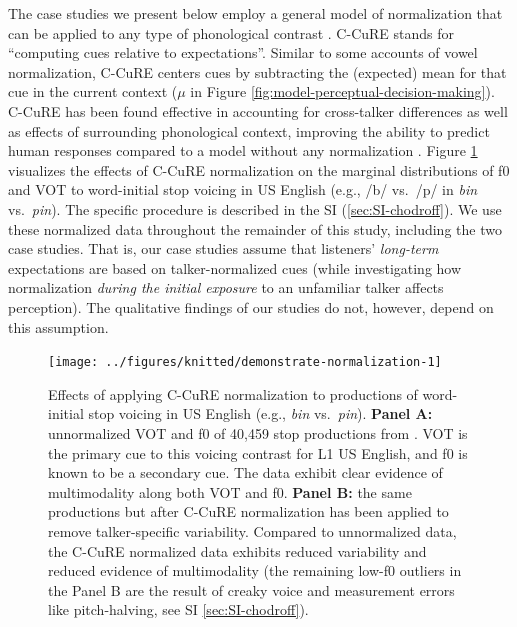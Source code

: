 \documentclass[
  11pt,
  man,floatsintext]{apa6}
\begin{document}
The case studies we present below employ a general model of normalization that can be applied to any type of phonological contrast \autocites[C-CuRE,][]{cole2010,mcmurray-jongman2011}. C-CuRE stands for ``computing cues relative to expectations''. Similar to some accounts of vowel normalization, C-CuRE centers cues by subtracting the (expected) mean for that cue in the current context (\(\mu\) in Figure \ref{fig:model-perceptual-decision-making}). C-CuRE has been found effective in accounting for cross-talker differences as well as effects of surrounding phonological context, improving the ability to predict human responses compared to a model without any normalization \autocites{mcmurray-jongman2011}[see also][]{apfelbaum-mcmurray2015,crinnion2020,kleinschmidt2020,mcmurray-jongman2016,xie2021cognition}. Figure \ref{fig:demonstrate-normalization} visualizes the effects of C-CuRE normalization on the marginal distributions of f0 and VOT to word-initial stop voicing in US English (e.g., /b/ vs.~/p/ in \emph{bin} vs.~\emph{pin}). The specific procedure is described in the SI (\ref{sec:SI-chodroff}). We use these normalized data throughout the remainder of this study, including the two case studies. That is, our case studies assume that listeners' \emph{long-term} expectations are based on talker-normalized cues (while investigating how normalization \emph{during the initial exposure} to an unfamiliar talker affects perception). The qualitative findings of our studies do not, however, depend on this assumption.



\begin{figure}

{\centering \texttt{[image: ../figures/knitted/demonstrate-normalization-1]} 

}

\caption{Effects of applying C-CuRE normalization to productions of word-initial stop voicing in US English (e.g., \emph{bin} vs.~\emph{pin}). \textbf{Panel A:} unnormalized VOT and f0 of 40,459 stop productions from \textcite{chodroff-wilson2018}. VOT is the primary cue to this voicing contrast for L1 US English, and f0 is known to be a secondary cue. The data exhibit clear evidence of multimodality along both VOT and f0. \textbf{Panel B:} the same productions but after C-CuRE normalization has been applied to remove talker-specific variability. Compared to unnormalized data, the C-CuRE normalized data exhibits reduced variability and reduced evidence of multimodality (the remaining low-f0 outliers in the Panel B are the result of creaky voice and measurement errors like pitch-halving, see SI \ref{sec:SI-chodroff}).}\label{fig:demonstrate-normalization}
\end{figure}
\end{document}
